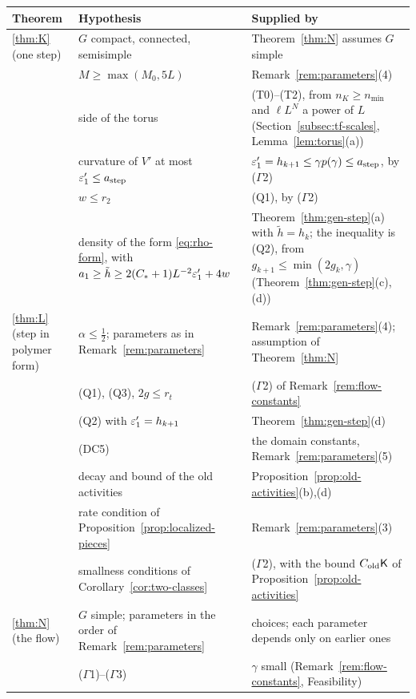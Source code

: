 \begin{table}[htbp]
\centering\small
\renewcommand{\arraystretch}{1.2}
\begin{tabular}{@{}p{}p{}p{}@{}}
\hline
\raggedright Theorem & \raggedright Hypothesis & \raggedright Supplied by \tabularnewline
\hline
\raggedright \ref{thm:K} (one step) & \raggedright $G$ compact, connected, semisimple & \raggedright Theorem~\ref{thm:N} assumes $G$ simple \tabularnewline
 & \raggedright $M\ge\max(M_0,5L)$ & \raggedright Remark~\ref{rem:parameters}(4) \tabularnewline
 & \raggedright side of the torus & \raggedright (T0)--(T2), from $n_K\ge n_{\min}$ and $\ell L^N$ a power of $L$ (Section~\ref{subsec:tf-scales}, Lemma~\ref{lem:torus}(a)) \tabularnewline
 & \raggedright curvature of $V'$ at most $\varepsilon'_1\le a_{\rm step}$ & \raggedright $\varepsilon'_1=h_{k+1}\le\gamma p(\gamma)\le a_{\rm step}$, by ($\Gamma$2) \tabularnewline
 & \raggedright $w\le r_2$ & \raggedright (Q1), by ($\Gamma$2) \tabularnewline
 & \raggedright density of the form \eqref{eq:rho-form}, with $a_1\ge\tilde h\ge2(C_*+1)L^{-2}\varepsilon'_1+4w$ & \raggedright Theorem~\ref{thm:gen-step}(a) with $\tilde h=h_k$; the inequality is (Q2), from $g_{k+1}\le\min(2g_k,\gamma)$ (Theorem~\ref{thm:gen-step}(c),(d)) \tabularnewline
\hline
\raggedright \ref{thm:L} (step in polymer form) & \raggedright $\alpha\le\frac12$; parameters as in Remark~\ref{rem:parameters} & \raggedright Remark~\ref{rem:parameters}(4); assumption of Theorem~\ref{thm:N} \tabularnewline
 & \raggedright (Q1), (Q3), $2g\le r_t$ & \raggedright ($\Gamma$2) of Remark~\ref{rem:flow-constants} \tabularnewline
 & \raggedright (Q2) with $\varepsilon'_1=h_{k+1}$ & \raggedright Theorem~\ref{thm:gen-step}(d) \tabularnewline
 & \raggedright (DC5) & \raggedright the domain constants, Remark~\ref{rem:parameters}(5) \tabularnewline
 & \raggedright decay and bound of the old activities & \raggedright Proposition~\ref{prop:old-activities}(b),(d) \tabularnewline
 & \raggedright rate condition of Proposition~\ref{prop:localized-pieces} & \raggedright Remark~\ref{rem:parameters}(3) \tabularnewline
 & \raggedright smallness conditions of Corollary~\ref{cor:two-classes} & \raggedright ($\Gamma$2), with the bound $C_{\rm old}\mathsf K$ of Proposition~\ref{prop:old-activities} \tabularnewline
\hline
\raggedright \ref{thm:N} (the flow) & \raggedright $G$ simple; parameters in the order of Remark~\ref{rem:parameters} & \raggedright choices; each parameter depends only on earlier ones \tabularnewline
 & \raggedright ($\Gamma$1)--($\Gamma$3) & \raggedright $\gamma$ small (Remark~\ref{rem:flow-constants}, Feasibility) \tabularnewline

\end{tabular}
\end{table}
